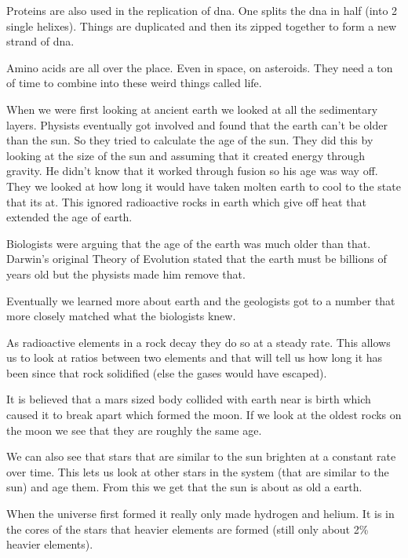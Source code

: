 \documentclass{article}
\begin{document}

Proteins are also used in the replication of dna. One splits the dna in half (into 2 single helixes). Things are duplicated and then its zipped together to form a new strand of dna.


Amino acids are all over the place. Even in space, on asteroids. They need a ton of time to combine into these weird things called life.


When we were first looking at ancient earth we looked at all the sedimentary layers. Physists eventually got involved and found that the earth can't be older than the sun. So they tried to calculate the age of the sun. They did this by looking at the size of the sun and assuming that it created energy through gravity. He didn't know that it worked through fusion so his age was way off. They we looked at how long it would have taken molten earth to cool to the state that its at. This ignored radioactive rocks in earth which give off heat that extended the age of earth.

Biologists were arguing that the age of the earth was much older than that. Darwin's original Theory of Evolution stated that the earth must be billions of years old but the physists made him remove that.


Eventually we learned more about earth and the geologists got to a number that more closely matched what the biologists knew.


As radioactive elements in a rock decay they do so at a steady rate. This allows us to look at ratios between two elements and that will tell us how long it has been since that rock solidified (else the gases would have escaped).

It is believed that a mars sized body collided with earth near is birth which caused it to break apart which formed the moon. If we look at the oldest rocks on the moon we see that they are roughly the same age.

We can also see that stars that are similar to the sun brighten at a constant rate over time. This lets us look at other stars in the system (that are similar to the sun) and age them. From this we get that the sun is about as old a earth.


When the universe first formed it really only made hydrogen and helium. It is in the cores of the stars that heavier elements are formed (still only about 2\% heavier elements).
\end{document}

